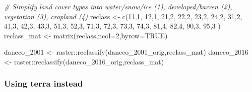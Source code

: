 \documentclass[
]{article}
\newenvironment{Shaded}{\begin{snugshade}}{\end{snugshade}}
\newcommand{\AttributeTok}[1]{\textcolor[rgb]{0.77,0.63,0.00}{#1}}
\newcommand{\CommentTok}[1]{\textcolor[rgb]{0.56,0.35,0.01}{\textit{#1}}}
\newcommand{\ConstantTok}[1]{\textcolor[rgb]{0.00,0.00,0.00}{#1}}
\newcommand{\DecValTok}[1]{\textcolor[rgb]{0.00,0.00,0.81}{#1}}
\newcommand{\FunctionTok}[1]{\textcolor[rgb]{0.00,0.00,0.00}{#1}}
\newcommand{\NormalTok}[1]{#1}
\newcommand{\OtherTok}[1]{\textcolor[rgb]{0.56,0.35,0.01}{#1}}
\newcommand{\SpecialCharTok}[1]{\textcolor[rgb]{0.00,0.00,0.00}{#1}}
\begin{document}
\begin{Shaded}
\begin{Highlighting}[]
\CommentTok{\# Simplify land cover types into water/snow/ice (1), developed/barren (2), vegetation (3), cropland (4)}
\NormalTok{reclass }\OtherTok{\textless{}{-}} \FunctionTok{c}\NormalTok{(}\DecValTok{11}\NormalTok{,}\DecValTok{1}\NormalTok{,}
             \DecValTok{12}\NormalTok{,}\DecValTok{1}\NormalTok{,}
             \DecValTok{21}\NormalTok{,}\DecValTok{2}\NormalTok{,}
             \DecValTok{22}\NormalTok{,}\DecValTok{2}\NormalTok{,}
             \DecValTok{23}\NormalTok{,}\DecValTok{2}\NormalTok{,}
             \DecValTok{24}\NormalTok{,}\DecValTok{2}\NormalTok{,}
             \DecValTok{31}\NormalTok{,}\DecValTok{2}\NormalTok{,}
             \DecValTok{41}\NormalTok{,}\DecValTok{3}\NormalTok{,}
             \DecValTok{42}\NormalTok{,}\DecValTok{3}\NormalTok{,}
             \DecValTok{43}\NormalTok{,}\DecValTok{3}\NormalTok{,}
             \DecValTok{51}\NormalTok{,}\DecValTok{3}\NormalTok{,}
             \DecValTok{52}\NormalTok{,}\DecValTok{3}\NormalTok{,}
             \DecValTok{71}\NormalTok{,}\DecValTok{3}\NormalTok{,}
             \DecValTok{72}\NormalTok{,}\DecValTok{3}\NormalTok{,}
             \DecValTok{73}\NormalTok{,}\DecValTok{3}\NormalTok{,}
             \DecValTok{74}\NormalTok{,}\DecValTok{3}\NormalTok{,}
             \DecValTok{81}\NormalTok{,}\DecValTok{4}\NormalTok{,}
             \DecValTok{82}\NormalTok{,}\DecValTok{4}\NormalTok{,}
             \DecValTok{90}\NormalTok{,}\DecValTok{3}\NormalTok{,}
             \DecValTok{95}\NormalTok{,}\DecValTok{3}
\NormalTok{          )}
\NormalTok{reclass\_mat }\OtherTok{\textless{}{-}} \FunctionTok{matrix}\NormalTok{(reclass,}\AttributeTok{ncol=}\DecValTok{2}\NormalTok{,}\AttributeTok{byrow=}\ConstantTok{TRUE}\NormalTok{)}

\NormalTok{daneco\_2001 }\OtherTok{\textless{}{-}}\NormalTok{ raster}\SpecialCharTok{::}\FunctionTok{reclassify}\NormalTok{(daneco\_2001\_orig,reclass\_mat)}
\NormalTok{daneco\_2016 }\OtherTok{\textless{}{-}}\NormalTok{ raster}\SpecialCharTok{::}\FunctionTok{reclassify}\NormalTok{(daneco\_2016\_orig,reclass\_mat)}
\end{Highlighting}
\end{Shaded}

\hypertarget{using-terra-instead}{%
\subsubsection{Using terra instead}\label{using-terra-instead}}
\end{document}

